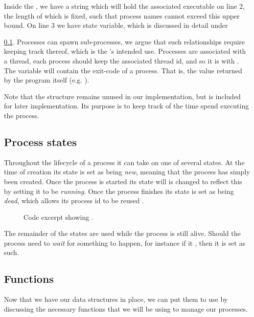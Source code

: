Inside the , we have a string which will hold
the associated executable on line 2, the length of which is fixed, such that
process names cannot exceed this upper bound. On line 3 we have state
variable, which is discussed in detail under
{\ref{sec:types|sub:process-states}. Processes can spawn sub-processes, we
argue that such relationships require keeping track thereof, which is the
's intended use. Processes are associated with a thread, each
process should keep the associated thread id, and so it is with
. The  variable will contain the exit-code of a
process. That is, the value returned by the program itself (e.g. ).

Note that the  structure remains unused in our implementation, but
is included for later implementation. Its purpose is to keep track of the time
spend executing the process.

\subsection{Process states}
\label{sec:types|sub:process-states}
Throughout the lifecycle of a process it can take on one of several states.
At the time of creation  its state is set
as being {\it new}, meaning that the process has simply been created. Once the
process is started  its state will is changed to
reflect this by setting it to be {\it running}. Once the process finishes its
state is set as being {\it dead}, which allows its process id to be reused
.
\begin{figure}[H]
    
    \label{code:process_state_t}
    \caption{Code excerpt showing .}
\end{figure}
The remainder of the states are used while the process is still alive. Should
the process need to {\it wait} for something to happen, for instance if it
 , then it is set as such.

\newpage
\subsection{Functions}
Now that we have our data structures in place, we can put them to use by
discussing the necessary functions that we will be using to manage our
processes.

}
